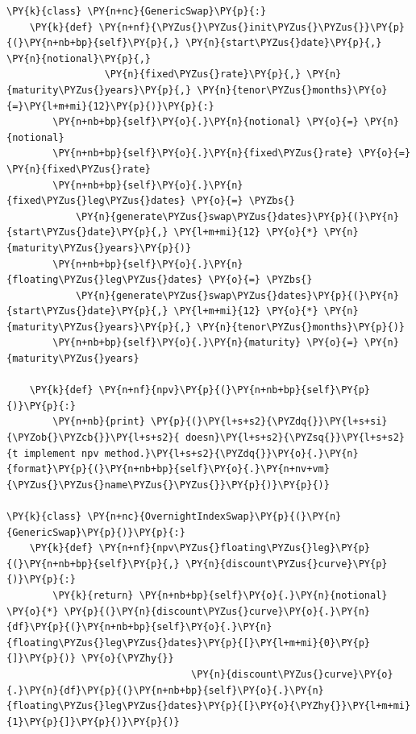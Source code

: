 \begin{tcolorbox}[breakable, size=fbox, boxrule=1pt, pad at break*=1mm,colback=cellbackground, colframe=cellborder]
\begin{Verbatim}[commandchars=\\\{\}]
\PY{k}{class} \PY{n+nc}{GenericSwap}\PY{p}{:}
    \PY{k}{def} \PY{n+nf}{\PYZus{}\PYZus{}init\PYZus{}\PYZus{}}\PY{p}{(}\PY{n+nb+bp}{self}\PY{p}{,} \PY{n}{start\PYZus{}date}\PY{p}{,} \PY{n}{notional}\PY{p}{,} 
                 \PY{n}{fixed\PYZus{}rate}\PY{p}{,} \PY{n}{maturity\PYZus{}years}\PY{p}{,} \PY{n}{tenor\PYZus{}months}\PY{o}{=}\PY{l+m+mi}{12}\PY{p}{)}\PY{p}{:}
        \PY{n+nb+bp}{self}\PY{o}{.}\PY{n}{notional} \PY{o}{=} \PY{n}{notional}
        \PY{n+nb+bp}{self}\PY{o}{.}\PY{n}{fixed\PYZus{}rate} \PY{o}{=} \PY{n}{fixed\PYZus{}rate}
        \PY{n+nb+bp}{self}\PY{o}{.}\PY{n}{fixed\PYZus{}leg\PYZus{}dates} \PY{o}{=} \PYZbs{}
            \PY{n}{generate\PYZus{}swap\PYZus{}dates}\PY{p}{(}\PY{n}{start\PYZus{}date}\PY{p}{,} \PY{l+m+mi}{12} \PY{o}{*} \PY{n}{maturity\PYZus{}years}\PY{p}{)}
        \PY{n+nb+bp}{self}\PY{o}{.}\PY{n}{floating\PYZus{}leg\PYZus{}dates} \PY{o}{=} \PYZbs{}
            \PY{n}{generate\PYZus{}swap\PYZus{}dates}\PY{p}{(}\PY{n}{start\PYZus{}date}\PY{p}{,} \PY{l+m+mi}{12} \PY{o}{*} \PY{n}{maturity\PYZus{}years}\PY{p}{,} \PY{n}{tenor\PYZus{}months}\PY{p}{)}
        \PY{n+nb+bp}{self}\PY{o}{.}\PY{n}{maturity} \PY{o}{=} \PY{n}{maturity\PYZus{}years}
	
    \PY{k}{def} \PY{n+nf}{npv}\PY{p}{(}\PY{n+nb+bp}{self}\PY{p}{)}\PY{p}{:}
        \PY{n+nb}{print} \PY{p}{(}\PY{l+s+s2}{\PYZdq{}}\PY{l+s+si}{\PYZob{}\PYZcb{}}\PY{l+s+s2}{ doesn}\PY{l+s+s2}{\PYZsq{}}\PY{l+s+s2}{t implement npv method.}\PY{l+s+s2}{\PYZdq{}}\PY{o}{.}\PY{n}{format}\PY{p}{(}\PY{n+nb+bp}{self}\PY{o}{.}\PY{n+nv+vm}{\PYZus{}\PYZus{}name\PYZus{}\PYZus{}}\PY{p}{)}\PY{p}{)}
	
\PY{k}{class} \PY{n+nc}{OvernightIndexSwap}\PY{p}{(}\PY{n}{GenericSwap}\PY{p}{)}\PY{p}{:}
    \PY{k}{def} \PY{n+nf}{npv\PYZus{}floating\PYZus{}leg}\PY{p}{(}\PY{n+nb+bp}{self}\PY{p}{,} \PY{n}{discount\PYZus{}curve}\PY{p}{)}\PY{p}{:}
        \PY{k}{return} \PY{n+nb+bp}{self}\PY{o}{.}\PY{n}{notional} \PY{o}{*} \PY{p}{(}\PY{n}{discount\PYZus{}curve}\PY{o}{.}\PY{n}{df}\PY{p}{(}\PY{n+nb+bp}{self}\PY{o}{.}\PY{n}{floating\PYZus{}leg\PYZus{}dates}\PY{p}{[}\PY{l+m+mi}{0}\PY{p}{]}\PY{p}{)} \PY{o}{\PYZhy{}}
                                \PY{n}{discount\PYZus{}curve}\PY{o}{.}\PY{n}{df}\PY{p}{(}\PY{n+nb+bp}{self}\PY{o}{.}\PY{n}{floating\PYZus{}leg\PYZus{}dates}\PY{p}{[}\PY{o}{\PYZhy{}}\PY{l+m+mi}{1}\PY{p}{]}\PY{p}{)}\PY{p}{)}
	

\end{Verbatim}
\end{tcolorbox}
